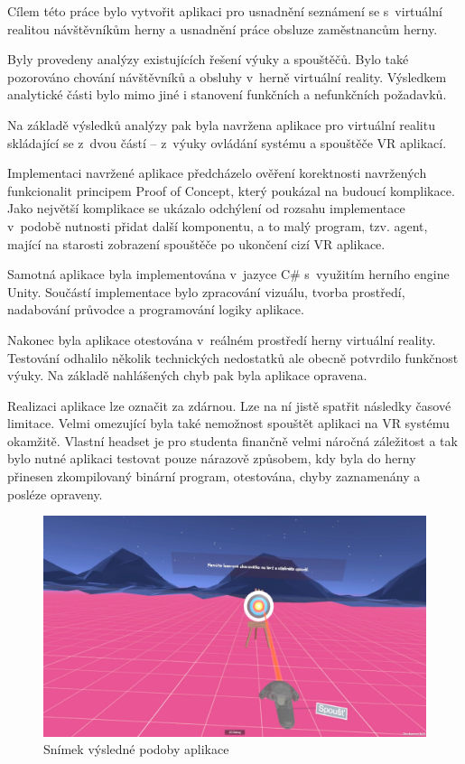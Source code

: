 Cílem této práce bylo vytvořit aplikaci pro usnadnění seznámení se
s~virtuální realitou návštěvníkům herny a usnadnění práce obsluze zaměstnancům herny.

Byly provedeny analýzy existujících řešení výuky a spouštěčů. Bylo také
pozorováno chování návštěvníků a obsluhy v~herně virtuální reality.
Výsledkem analytické části bylo mimo jiné i stanovení funkčních a
nefunkčních požadavků.

Na základě výsledků analýzy pak byla navržena aplikace pro virtuální
realitu skládající se z~dvou částí -- z~výuky ovládání systému a
spouštěče VR aplikací.

Implementaci navržené aplikace předcházelo ověření korektnosti
navržených funkcionalit principem Proof of Concept, který poukázal na
budoucí komplikace. Jako největší komplikace se ukázalo odchýlení od
rozsahu implementace v~podobě nutnosti přidat další komponentu, a to
malý program, tzv. agent, mající na starosti zobrazení spouštěče po
ukončení cizí VR aplikace.

Samotná aplikace byla implementována v~jazyce C\# s~využitím herního
engine Unity. Součástí implementace bylo zpracování vizuálu, tvorba
prostředí, nadabování průvodce a programování logiky aplikace.

Nakonec byla aplikace otestována v~reálném prostředí herny virtuální
reality. Testování odhalilo několik technických nedostatků ale obecně
potvrdilo funkčnost výuky. Na základě nahlášených chyb pak byla aplikace
opravena.

Realizaci aplikace lze označit za zdárnou. Lze na ní jistě spatřit
následky časové limitace. Velmi omezující byla také nemožnost spouštět
aplikaci na VR systému okamžitě. Vlastní headset je pro studenta
finančně velmi náročná záležitost a tak bylo nutné aplikaci testovat
pouze nárazově způsobem, kdy byla do herny přinesen zkompilovaný
binární program, otestována, chyby zaznamenány a posléze opraveny.

\begin{figure}[h!]
\centering
\includegraphics[width=12cm]{src/assets/result.png}
\caption{Snímek výsledné podoby aplikace}
\end{figure}


